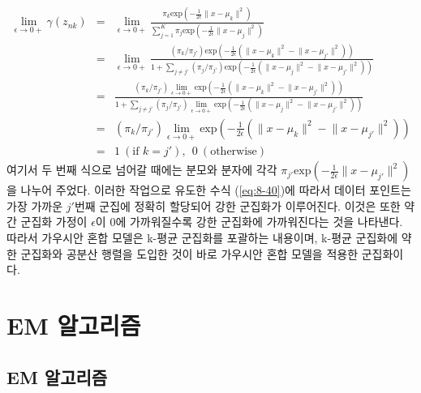 \documentclass[a4paper]{oblivoir}
\begin{document}
\begin{eqnarray}
\lim_{\epsilon \to 0+} \gamma(z_{nk}) & = & \lim_{\epsilon \to 0+} \frac{ \pi_{k} \textrm{exp}(-\frac{1}{2\epsilon} \lVert {x}- {\mu}_{k} \rVert^2 ) }{ \sum_{j=1}^{K} \pi_{j} \textrm{exp}(-\frac{1}{2\epsilon} \lVert {x}- {\mu}_{j} \rVert^2) } \nonumber  \\
& = & \lim_{\epsilon \to 0+} \frac{ (\pi_{k}/\pi_{j'}) \textrm{exp}(-\frac{1}{2\epsilon} (\lVert {x}- {\mu}_{k} \rVert^2 - \lVert {x} - {\mu}_{j'} \rVert^2)) }{ 1 + \sum_{j \neq j'} (\pi_{j}/\pi_{j'}) \textrm{exp}(-\frac{1}{2\epsilon} (\lVert {x}- {\mu}_{j} \rVert^2- \lVert {x} - {\mu}_{j'} \rVert^2)) } \nonumber  \\ 
& = &  \frac{ (\pi_{k}/\pi_{j'}) \lim_{\epsilon \to 0+} \textrm{exp}(-\frac{1}{2\epsilon} (\lVert {x}- {\mu}_{k} \rVert^2 - \lVert {x} - {\mu}_{j'} \rVert^2)) }{ 1 + \sum_{j \neq j'} (\pi_{j}/\pi_{j'}) \lim_{\epsilon \to 0+} \textrm{exp}(-\frac{1}{2\epsilon} (\lVert {x}- {\mu}_{j} \rVert^2- \lVert {x} - {\mu}_{j'} \rVert^2)) }  \nonumber  \\ 
& = &   (\pi_{k}/\pi_{j'}) \lim_{\epsilon \to 0+} \textrm{exp}(-\frac{1}{2\epsilon} (\lVert {x}- {\mu}_{k} \rVert^2 - \lVert {x} - {\mu}_{j'} \rVert^2)) \nonumber  \\ 
& = & 1 \ (\textrm{if } k=j'), \ \ 0 \ (\textrm{otherwise})  \label{eq:8-40}
\end{eqnarray}
여기서 두 번째 식으로 넘어갈 때에는 분모와 분자에 각각 $\pi_{j'} \textrm{exp}(-\frac{1}{2\epsilon} \lVert {x} - {\mu}_{j'} \rVert^2) $을 나누어 주었다. 이러한 작업으로 유도한 수식 (\ref{eq:8-40})에 따라서 데이터 포인트는 가장 가까운 $j'$번째 군집에 정확히 할당되어 강한 군집화가 이루어진다. 이것은 또한 약간 군집화 가정이 $\epsilon$이 0에 가까워질수록 강한 군집화에 가까워진다는 것을 나타낸다. 따라서 가우시안 혼합 모델은 k-평균 군집화를 포괄하는 내용이며, k-평균 군집화에 약한 군집화와 공분산 행렬을 도입한 것이 바로 가우시안 혼합 모델을 적용한 군집화이다.  \\

\section{EM 알고리즘}

\subsection{EM 알고리즘}
\end{document}
